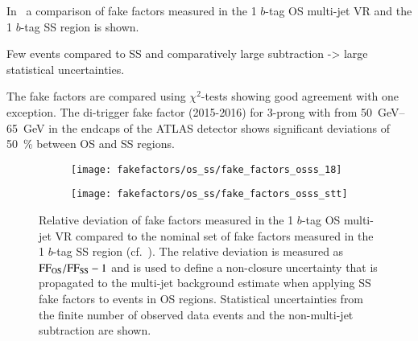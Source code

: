 In~ a comparison of fake factors measured
in the 1 $b$-tag OS multi-jet VR and the 1 $b$-tag SS region is
shown.

Few events compared to SS and comparatively large subtraction -> large
statistical uncertainties.

The fake factors are compared using $\chi^2$-tests showing good
agreement with one exception. The di-\tauhadvis trigger fake factor
(2015-2016) for 3-prong \tauhadvis with \pT from
\SIrange{50}{65}{\GeV} in the endcaps of the ATLAS detector shows
significant deviations of \SI{50}{\percent} between OS and SS regions.



%

\begin{figure}[htbp]
  \centering

  \begin{subfigure}[t]{0.48\textwidth}
    \texttt{[image: fakefactors/os\_ss/fake\_factors\_osss\_18]}
  \end{subfigure}\hfill%
  \begin{subfigure}[t]{0.48\textwidth}
    \texttt{[image: fakefactors/os\_ss/fake\_factors\_osss\_stt]}
  \end{subfigure}

  \caption{Relative deviation of fake factors measured in the 1
    $b$-tag OS multi-jet VR compared to the nominal set of fake
    factors measured in the 1 $b$-tag SS region (cf.\
    ). The relative
    deviation is measured as $\text{FF}_\text{OS} / \text{FF}_\text{SS} - 1$ and
    is used to define a non-closure uncertainty that is propagated to
    the multi-jet background estimate when applying SS fake factors to
    events in OS regions. Statistical uncertainties from the finite
    number of observed data events and the non-multi-jet subtraction
    are shown.}
  \label{fig:fake_factor_OSSS}
\end{figure}



